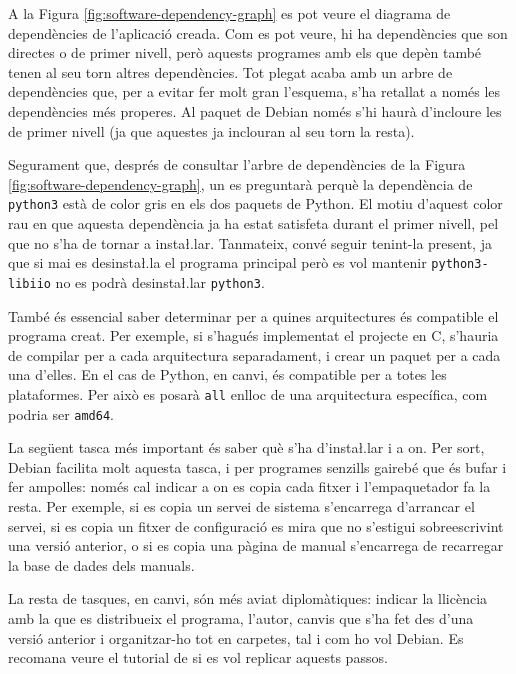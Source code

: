 A la Figura \ref{fig:software-dependency-graph} es pot veure el diagrama de
dependències de l'aplicació creada. Com es pot veure, hi ha dependències que
son directes o de primer nivell, però aquests programes amb els que depèn també
tenen al seu torn altres dependències. Tot plegat acaba amb un arbre de
dependències que, per a evitar fer molt gran l'esquema, s'ha retallat a només
les dependències més properes. Al paquet de Debian només s'hi haurà d'incloure
les de primer nivell (ja que aquestes ja inclouran al seu torn la resta).



Segurament que, després de consultar l'arbre de dependències de la Figura
\ref{fig:software-dependency-graph}, un es preguntarà perquè la dependència
de \texttt{python3} està de color gris en els dos paquets de Python. El motiu
d'aquest color rau en que aquesta dependència ja ha estat satisfeta durant el
primer nivell, pel que no s'ha de tornar a insta\l.lar. Tanmateix, convé seguir
tenint-la present, ja que si mai es desinsta\l.la el programa principal però es
vol mantenir \texttt{python3-libiio} no es podrà desinsta\l.lar \texttt{python3}.

També és essencial saber determinar per a quines arquitectures és compatible el
programa creat. Per exemple, si s'hagués implementat el projecte en C, s'hauria
de compilar per a cada arquitectura separadament, i crear un paquet per a cada
una d'elles. En el cas de Python, en canvi, és compatible per a totes les
plataformes. Per això es posarà \texttt{all} enlloc de una arquitectura específica,
com podria ser \texttt{amd64}.

La següent tasca més important és saber què s'ha d'insta\l.lar i a on. Per sort,
Debian facilita molt aquesta tasca, i per programes senzills gairebé que és
bufar i fer ampolles: només cal indicar a on es copia cada fitxer i l'empaquetador
fa la resta. Per exemple, si es copia un servei de sistema s'encarrega d'arrancar
el servei, si es copia un fitxer de configuració es mira que no s'estigui
sobreescrivint una versió anterior, o si es copia una pàgina de manual s'encarrega
de recarregar la base de dades dels manuals.

La resta de tasques, en canvi, són més aviat diplomàtiques: indicar la llicència
amb la que es distribueix el programa, l'autor, canvis que s'ha fet des d'una
versió anterior i organitzar-ho tot en carpetes, tal i com ho vol Debian.
Es recomana veure el tutorial de \cite{DebCreation} si es vol replicar aquests passos.

